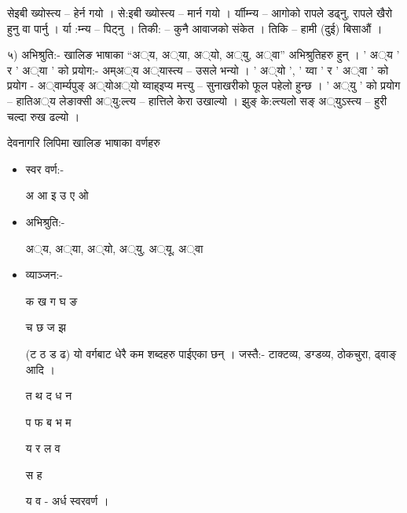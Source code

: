 \documentclass[oldfontcommands,oneside,a4paper,11pt]{article}
\begin{document}
सेइबी ख्योस्त्य –  हेर्न गयो । से:इबी ख्योस्त्य –  मार्न गयो ।
र्याीम्‍न्य – आगोको रापले डढ्‍नु, रापले खैरो हुनु वा पार्नु । र्या :म्‍न्य – पिट्‍नु । 
तिकी: – कुनै आवाजको संकेत । तिकि –  हामी (दुई) बिसाऔं ।

५) अभिश्रुति:- खालिङ भाषाका “अ‌‍्य, अ‌‍्या, अ‌‍्यो, अ‌‍्यु, अ‌‍्वा” अभिश्रुतिहरु हुन् । 
' अ‌‍्य ' र ' अ‌‍्या ' को प्रयोग:- अम्अ‌‍्य अ‌‍्यास्त्य – उसले भन्यो ।
' अ‌‍्यो ',  ' य्वा '  र  ' अ‌‍्वा ' को प्रयोग -  
अ‌‍्वार्म्यपुङ् अ‌‍्योअ‌‍्यो य्वाह्इप्य मत्त्यु – सुनाखरीको फूल पहेलो हुन्छ ।
' अ‌‍्यु ' को प्रयोग – 
हातिअ‌‍्य लेङाक्सी अ‌‍्यु:ल्त्य – हात्तिले केरा उखाल्यो ।
झुङ् के:ल्त्यलो सङ् अ‌‍्युऽस्त्य – हुरी चल्दा रुख ढल्यो ।

देवनागरि लिपिमा खालिङ भाषाका वर्णहरु
\begin{itemize}
\item स्वर वर्ण:- 

अ आ इ उ ए ओ 

\item अभिश्रुति:- 

अ‌‍्य, अ‌‍्या, अ‌‍्यो, अ‌‍्यु, अ‌‍्यू, अ‌‍्वा 

\item व्याञ्‍जन:-

क ख ग घ ङ    

च छ ज झ  

(ट ठ ड ढ) यो वर्गबाट धेरै कम शब्दहरु पाईएका छन् । जस्तै:- टाक्टव्य, डग्डव्य, ठोकचुरा, ढ्वाङ् आदि ।
 
त थ द ध न 

प फ ब भ म    

य र ल व    

स  ह

य व - अर्ध स्वरवर्ण ।

\end{itemize}



\setlength\parindent{0cm}
\setlength{\parskip}{-0.5cm}
\end{document}
